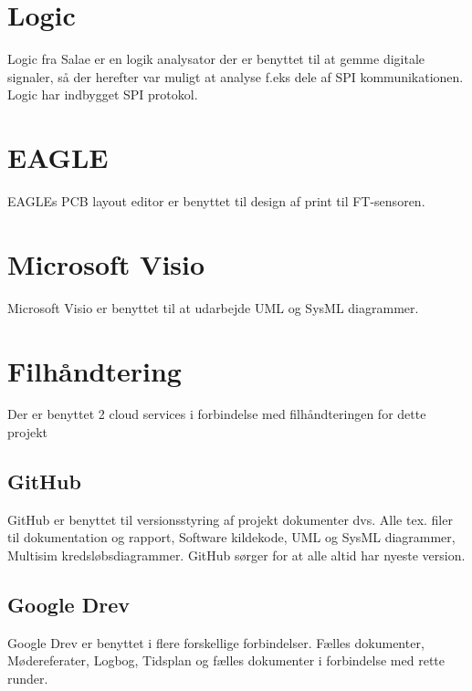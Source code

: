 \section{Logic}
Logic fra Salae er en logik analysator der er benyttet til at gemme digitale signaler, så der herefter var muligt at analyse f.eks dele af SPI kommunikationen. Logic har indbygget SPI protokol.

\section{EAGLE}
EAGLEs PCB layout editor er benyttet til design af print til FT-sensoren.

\section{Microsoft Visio}
Microsoft Visio er benyttet til at udarbejde UML og SysML diagrammer. 

\section{Filhåndtering}
Der er benyttet 2 cloud services i forbindelse med filhåndteringen for dette projekt

\subsection{GitHub}
GitHub er benyttet til versionsstyring af projekt dokumenter dvs. Alle tex. filer til dokumentation og rapport, Software kildekode, UML og SysML diagrammer, Multisim kredsløbsdiagrammer. GitHub sørger for at alle altid har nyeste version. 

\subsection{Google Drev}
Google Drev er benyttet i flere forskellige forbindelser. Fælles dokumenter, Mødereferater, Logbog, Tidsplan og fælles dokumenter i forbindelse med rette runder.


